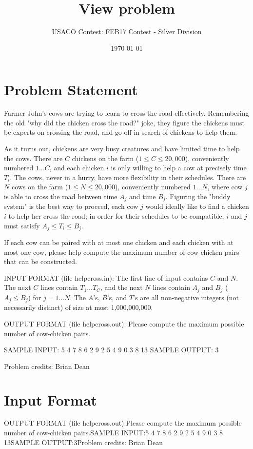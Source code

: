 \documentclass[12pt]{article}
\title{View problem}
\author{USACO Contest: FEB17 Contest - Silver Division}
\date{\today}
\begin{document}
\maketitle

\section*{Problem Statement}

Farmer John's cows are trying to learn to cross the road effectively. 
Remembering the old "why did the chicken cross the road?" joke, they figure the
chickens must be experts on crossing the road, and go off in search of chickens
to help them.

As it turns out, chickens are very busy creatures and have limited time to help
the cows.  There are $C$ chickens on the farm ($1 \leq C \leq 20,000$), 
conveniently numbered $1 \ldots C$, and each chicken $i$ is only willing to help
a cow at precisely time $T_i$.  The cows, never in a hurry, have more
flexibility in their schedules.  There are  $N$ cows on the farm
($1 \leq N \leq 20,000$), conveniently numbered $1 \ldots N$, where cow $j$ is
able to cross the road between time $A_j$ and time $B_j$. Figuring the "buddy
system" is the best way to proceed, each cow $j$ would ideally like to find a
chicken $i$ to help her cross the road; in order for their  schedules to be
compatible, $i$ and $j$ must satisfy $A_j \leq T_i \leq B_j$.

If each cow can be paired with at most one chicken and each chicken with at most
one cow, please help compute the maximum number of cow-chicken pairs that can be
constructed.

INPUT FORMAT (file helpcross.in):
The first line of input contains $C$ and $N$.  The next $C$ lines contain
$T_1 \ldots T_C$, and the next $N$ lines contain $A_j$ and $B_j$ ($A_j \leq B_j$) for
$j = 1 \ldots N$.  The $A$'s, $B$'s, and $T$'s are all non-negative integers
(not necessarily distinct) of size at most 1,000,000,000.  

OUTPUT FORMAT (file helpcross.out):
Please compute the maximum possible number of cow-chicken pairs.

SAMPLE INPUT:
5 4
7
8
6
2
9
2 5
4 9
0 3
8 13
SAMPLE OUTPUT: 
3


Problem credits: Brian Dean



\section*{Input Format}
OUTPUT FORMAT (file helpcross.out):Please compute the maximum possible number of cow-chicken pairs.SAMPLE INPUT:5 4
7
8
6
2
9
2 5
4 9
0 3
8 13SAMPLE OUTPUT:3Problem credits: Brian Dean
\end{document}
